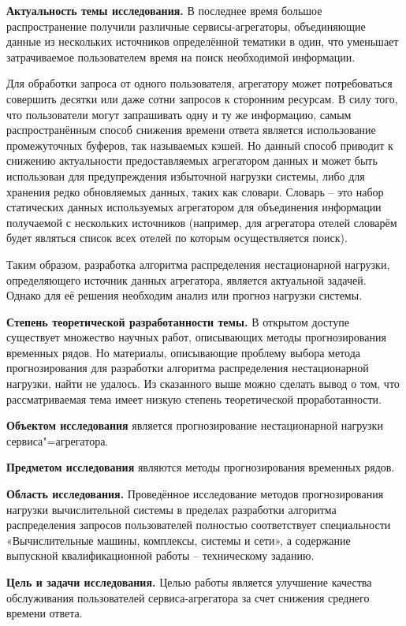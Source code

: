 {\bfseries Актуальность темы исследования.} 
В последнее время большое распространение получили различные 
сервисы-агрегаторы, объединяющие данные из нескольких источников
определённой тематики в один, что уменьшает затрачиваемое пользователем
время на поиск необходимой информации. 

Для обработки запроса от одного пользователя, агрегатору может 
потребоваться совершить десятки или даже сотни запросов к сторонним 
ресурсам. В силу того, что пользователи могут запрашивать одну и ту же 
информацию, самым распространённым способ снижения времени ответа 
является использование промежуточных буферов, так называемых кэшей. Но 
данный способ приводит к снижению актуальности предоставляемых 
агрегатором данных и может быть использован для предупреждения 
избыточной нагрузки системы, либо для хранения редко обновляемых данных, 
таких как словари. Словарь -- это набор статических данных используемых 
агрегатором для объединения информации получаемой с нескольких источников 
(например, для агрегатора отелей словарём будет являться список всех отелей 
по которым осуществляется поиск). 

Таким образом, разработка алгоритма распределения нестационарной нагрузки, 
определяющего источник данных агрегатора, является актуальной задачей. 
Однако для её решения необходим анализ или прогноз нагрузки системы.

{\bfseries Степень теоретической разработанности темы.}
В открытом доступе существует множество научных работ, описывающих 
методы прогнозирования временных рядов. Но материалы, описывающие 
проблему выбора метода прогнозирования для разработки алгоритма 
распределения нестационарной нагрузки, найти не удалось. Из сказанного выше 
можно сделать вывод о том, что рассматриваемая тема имеет низкую степень 
теоретической проработанности.

{\bfseries Объектом исследования} является прогнозирование нестационарной 
нагрузки сервиса"=агрегатора.

{\bfseries Предметом исследования} являются методы прогнозирования 
временных рядов.

{\bfseries Область исследования.} Проведённое исследование методов 
прогнозирования нагрузки вычислительной системы в пределах разработки 
алгоритма распределения запросов пользователей полностью соответствует 
специальности «Вычислительные машины, комплексы, системы и сети», а 
содержание выпускной квалификационной работы -- техническому
заданию.

{\bfseries Цель и задачи исследования.}  Целью работы является улучшение 
качества обслуживания пользователей сервиса-агрегатора за счет снижения 
среднего времени ответа.

